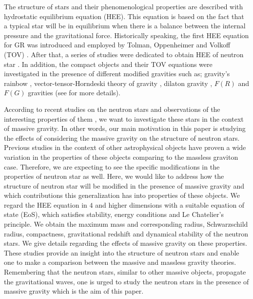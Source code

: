 \documentclass[aps]{revtex4}
\begin{document}
The structure of stars and their phenomenological properties are
described with hydrostatic equilibrium equation (HEE). This
equation is based on the fact that a typical star will be in
equilibrium when there is a balance between the internal pressure
and the gravitational force. Historically speaking, the first HEE
equation for GR was introduced and employed by Tolman, Oppenheimer
and Volkoff (TOV) \cite{Tolman,Tolman1939,Oppenheimer}. After
that, a series of studies were dedicated to obtain HEE of neutron
star
\cite{YunesV,SilbarR,NarainSM,BordbarH,BoonsermVW,LiWC,OliveiraVFS,HeFLN}.
In addition, the compact objects and their TOV equations were
investigated in the presence of different modified gravities such
as; gravity's rainbow \cite{HendiBEP}, vector-tensor-Horndeski
theory of gravity \cite{MomeniarXiv}, dilaton gravity
\cite{Hendi2015}, $F(R)$ and $F(G)$ gravities
\cite{CapozzielloF(R),AstashenokCOU,AstashenokCOJCAP,SavasDY,ZhouYZY}
(see
\cite{Harada,Wiseman,Sotani,DelidumanEK,DonevaYSK,ChamelHZF,BaraussePPL,SilvaSBH,AsCoOd,BrihayeR,DasRGR,
StaykovDYK,Boyadjiev,Meyer,OrellanaGPR,ArbanilLZ,GoswamiNMG,GlampedakisPSB,GreenS,CandelasHSW}
for more details).

According to recent studies on the neutron stars and observations
of the interesting properties of them
\cite{Sigurdsson,Vietri,Heger,Rea,Perna,Katayama,Clausen,Hebeler,
Perez,Deaton,Dall'Osso,Venumadhav,Poutanen,East,Zheng,Mastrano,Giacomazz,Gelfand,Wielgus,Ruiz},
we want to investigate these stars in the context of massive
gravity. In other words, our main motivation in this paper is
studying the effects of considering the massive gravity on the
structure of neutron stars. Previous studies in the context of
other astrophysical objects have proven a wide variation in the
properties of these objects comparing to the massless graviton
case. Therefore, we are expecting to see the specific
modifications in the properties of neutron star as well. Here, we
would like to address how the structure of neutron star will be
modified in the presence of massive gravity and which
contributions this generalization has into properties of these
objects. We regard the HEE equation in $4$ and higher dimensions
with a suitable equation of state (EoS), which satisfies
stability, energy conditions and Le Chatelier's principle. We
obtain the maximum mass and corresponding radius, Schwarzschild
radius, compactness, gravitational redshift and dynamical
stability of the neutron stars. We give details regarding the
effects of massive gravity on these properties. These studies
provide an insight into the structure of neutron stars and enable
one to make a comparison between the massive and massless gravity
theories. Remembering that the neutron stars, similar to other
massive objects, propagate the gravitational waves, one is urged
to study the neutron stars in the presence of massive gravity
which is the aim of this paper.
\end{document}
